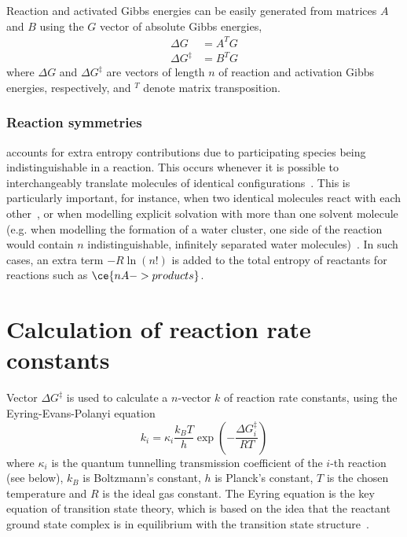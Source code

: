 Reaction and activated Gibbs energies can be easily generated from matrices $A$ and $B$ using the $G$ vector of absolute Gibbs energies,
% 
\begin{equation}
	\begin{split}
		\Delta G &= A^T G \\
		\Delta G^\ddagger &= B^T G
	\end{split}
\end{equation}
% 
where $\Delta G$ and $\Delta G^\ddagger$ are vectors of length $n$ of reaction and activation Gibbs energies,
respectively,
and $^T$ denote matrix transposition.

\subsubsection{Reaction symmetries}

\overreact{} accounts for extra entropy contributions due to participating species being indistinguishable in a reaction.
This occurs whenever it is possible to interchangeably translate molecules of identical configurations~\cite{Fern_ndez_Ramos_2007,Gilson_2010}.
This is particularly important,
for instance,
when two identical molecules react with each other~\cite{Fern_ndez_Ramos_2007,Gilson_2010},
or when modelling explicit solvation with more than one solvent molecule (e.g.
when modelling the formation of a water cluster,
one side of the reaction would contain $n$ indistinguishable,
infinitely separated water molecules)~\cite{Jensen_2015}.
In such cases,
an extra term $-R \ln{\left( n! \right)}$ is added to the total entropy of reactants for reactions such as $\ce{n A -> products}$.

\section{Calculation of reaction rate constants}%
\label{sec:rates}

Vector $\Delta G^\ddagger$ is used to calculate a $n$-vector $k$ of reaction rate constants,
using the Eyring-Evans-Polanyi equation~\cite{Eyring_1935,Evans_1935}
% 
\begin{equation}\label{eq:rate-consts}
	k_i = \kappa_i \frac{k_B T}{h}
	\exp \left(-\frac{\Delta G_i^\ddagger}{R T} \right)
\end{equation}
% 
where $\kappa_i$ is the quantum tunnelling transmission coefficient of the $i$-th reaction (see below),
$k_B$ is Boltzmann's constant,
$h$ is Planck's constant,
$T$ is the chosen temperature and $R$ is the ideal gas constant.
The Eyring equation is the key equation of transition state theory,
which is based
on the idea that the reactant ground state complex is in equilibrium
with the transition state structure~\cite{TransitionStateTheory}.

